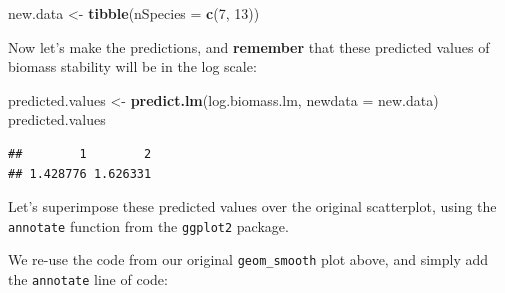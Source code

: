 \documentclass[
]{book}
\newenvironment{Shaded}{\begin{snugshade}}{\end{snugshade}}
\newcommand{\AttributeTok}[1]{\textcolor[rgb]{0.13,0.29,0.53}{#1}}
\newcommand{\ConstantTok}[1]{\textcolor[rgb]{0.56,0.35,0.01}{#1}}
\newcommand{\DecValTok}[1]{\textcolor[rgb]{0.00,0.00,0.81}{#1}}
\newcommand{\FloatTok}[1]{\textcolor[rgb]{0.00,0.00,0.81}{#1}}
\newcommand{\FunctionTok}[1]{\textcolor[rgb]{0.13,0.29,0.53}{\textbf{#1}}}
\newcommand{\NormalTok}[1]{#1}
\newcommand{\OtherTok}[1]{\textcolor[rgb]{0.56,0.35,0.01}{#1}}
\newcommand{\SpecialCharTok}[1]{\textcolor[rgb]{0.81,0.36,0.00}{\textbf{#1}}}
\newcommand{\StringTok}[1]{\textcolor[rgb]{0.31,0.60,0.02}{#1}}
\begin{document}
\begin{Shaded}
\begin{Highlighting}[]
\NormalTok{new.data }\OtherTok{\textless{}{-}} \FunctionTok{tibble}\NormalTok{(}\AttributeTok{nSpecies =} \FunctionTok{c}\NormalTok{(}\DecValTok{7}\NormalTok{, }\DecValTok{13}\NormalTok{))}
\end{Highlighting}
\end{Shaded}

Now let's make the predictions, and \textbf{remember} that these predicted values of biomass stability will be in the log scale:

\begin{Shaded}
\begin{Highlighting}[]
\NormalTok{predicted.values }\OtherTok{\textless{}{-}} \FunctionTok{predict.lm}\NormalTok{(log.biomass.lm, }\AttributeTok{newdata =}\NormalTok{ new.data)}
\NormalTok{predicted.values}
\end{Highlighting}
\end{Shaded}

\begin{verbatim}
##        1        2 
## 1.428776 1.626331
\end{verbatim}

Let's superimpose these predicted values over the original scatterplot, using the \texttt{annotate} function from the \texttt{ggplot2} package.

We re-use the code from our original \texttt{geom\_smooth} plot above, and simply add the \texttt{annotate} line of code:

\begin{Shaded}
\end{Shaded}
\end{document}
